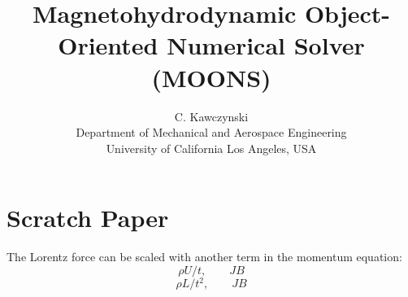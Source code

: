 \documentclass[11pt]{article}
\begin{document}
\doublespacing
\title{Magnetohydrodynamic Object-Oriented Numerical Solver (MOONS)}
\author{C. Kawczynski \\
Department of Mechanical and Aerospace Engineering \\
University of California Los Angeles, USA\\
}
\maketitle

\section{Scratch Paper}
The Lorentz force can be scaled with another term in the momentum equation:
\begin{equation}
	\rho U/t, \qquad 
	J B
\end{equation}
\begin{equation}
	\rho L/t^2, \qquad 
	J B
\end{equation}
\end{document}
